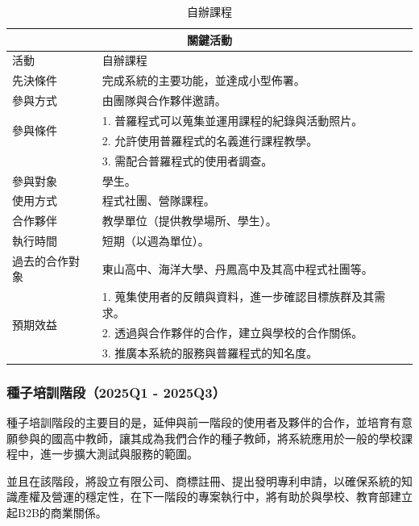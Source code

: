 \begin{table}[H]
  \centering
  \caption{自辦課程}
  \begin{tabular}{|l|l|}
      \hline
      \multicolumn{2}{|c|}{\textbf{關鍵活動}} \\ \hline
      活動 & 自辦課程 \\ \hline
      先決條件 & 完成系統的主要功能，並達成小型佈署。 \\ \hline
      參與方式 & 由團隊與合作夥伴邀請。 \\ \hline
      \multirow{2}{*}{參與條件} & 1. 普羅程式可以蒐集並運用課程的紀錄與活動照片。 \\
      & 2. 允許使用普羅程式的名義進行課程教學。 \\
      & 3. 需配合普羅程式的使用者調查。 \\ \hline
      參與對象 & 學生。 \\ \hline
      使用方式 & 程式社團、營隊課程。 \\ \hline 
      合作夥伴 & 教學單位（提供教學場所、學生）。 \\ \hline
      執行時間 & 短期（以週為單位）。 \\ \hline 
      過去的合作對象 & 東山高中、海洋大學、丹鳳高中及其高中程式社團等。 \\ \hline
      \multirow{3}{*}{預期效益} & 1. 蒐集使用者的反饋與資料，進一步確認目標族群及其需求。 \\
      & 2. 透過與合作夥伴的合作，建立與學校的合作關係。 \\
      & 3. 推廣本系統的服務與普羅程式的知名度。 \\ \hline
  \end{tabular}
\end{table}

\subsubsection{種子培訓階段（2025Q1 - 2025Q3）}

種子培訓階段的主要目的是，延伸與前一階段的使用者及夥伴的合作，並培育有意願參與的國高中教師，讓其成為我們合作的種子教師，將系統應用於一般的學校課程中，進一步擴大測試與服務的範圍。

並且在該階段，將設立有限公司、商標註冊、提出發明專利申請，以確保系統的知識產權及營運的穩定性，在下一階段的專案執行中，將有助於與學校、教育部建立起B2B的商業關係。

